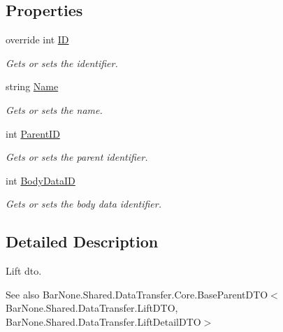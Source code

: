 \subsection*{Properties}
\begin{DoxyCompactItemize}
\item 
override int \mbox{\hyperlink{class_bar_none_1_1_shared_1_1_data_transfer_1_1_lift_d_t_o_a45716bb938b1500f5da601a5c32bea0c}{ID}}
\begin{DoxyCompactList}\small\item\em Gets or sets the identifier. \end{DoxyCompactList}\item 
string \mbox{\hyperlink{class_bar_none_1_1_shared_1_1_data_transfer_1_1_lift_d_t_o_a9da163c73c8b4be1d356d9e79c820e1a}{Name}}
\begin{DoxyCompactList}\small\item\em Gets or sets the name. \end{DoxyCompactList}\item 
int \mbox{\hyperlink{class_bar_none_1_1_shared_1_1_data_transfer_1_1_lift_d_t_o_ac11e0b4131af672f57744b7522a44ba3}{Parent\+ID}}
\begin{DoxyCompactList}\small\item\em Gets or sets the parent identifier. \end{DoxyCompactList}\item 
int \mbox{\hyperlink{class_bar_none_1_1_shared_1_1_data_transfer_1_1_lift_d_t_o_a887baec386af0c0ee5f5538b62a99de6}{Body\+Data\+ID}}
\begin{DoxyCompactList}\small\item\em Gets or sets the body data identifier. \end{DoxyCompactList}\end{DoxyCompactItemize}


\subsection{Detailed Description}
Lift dto. 

\begin{DoxySeeAlso}{See also}
Bar\+None.\+Shared.\+Data\+Transfer.\+Core.\+Base\+Parent\+D\+T\+O$<$\+Bar\+None.\+Shared.\+Data\+Transfer.\+Lift\+D\+T\+O, Bar\+None.\+Shared.\+Data\+Transfer.\+Lift\+Detail\+D\+T\+O$>$


\end{DoxySeeAlso}


